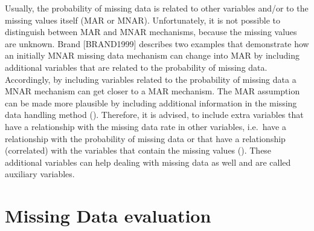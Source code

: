\documentclass[]{book}
\begin{document}
Usually, the probability of missing data is related to other variables
and/or to the missing values itself (MAR or MNAR). Unfortunately, it is
not possible to distinguish between MAR and MNAR mechanisms, because the
missing values are unknown. Brand {[}BRAND1999{]} describes two examples
that demonstrate how an initially MNAR missing data mechanism can change
into MAR by including additional variables that are related to the
probability of missing data. Accordingly, by including variables related
to the probability of missing data a MNAR mechanism can get closer to a
MAR mechanism. The MAR assumption can be made more plausible by
including additional information in the missing data handling method
(\citet{Baraldi2010}). Therefore, it is advised, to include extra
variables that have a relationship with the missing data rate in other
variables, i.e.~have a relationship with the probability of missing data
or that have a relationship (correlated) with the variables that contain
the missing values (\citet{Collins2001}). These additional variables can
help dealing with missing data as well and are called auxiliary
variables.

\section{Missing Data evaluation}\label{missing-data-evaluation-1}
\end{document}
